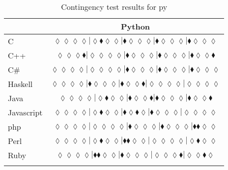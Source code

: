 \begin{table*}
\centering
\begin{tabular}{l c}
& Python \\
\hline

C & $\scriptscriptstyle\lozenge\lozenge\lozenge\lozenge|\lozenge\blacklozenge\lozenge\lozenge|\blacklozenge\lozenge\lozenge\lozenge|\blacklozenge\lozenge\lozenge\lozenge|\blacklozenge\lozenge\lozenge\lozenge$ \\
C++ & $\scriptscriptstyle\lozenge\lozenge\lozenge\blacklozenge|\lozenge\lozenge\lozenge\lozenge|\blacklozenge\lozenge\lozenge\lozenge|\blacklozenge\lozenge\lozenge\lozenge|\blacklozenge\lozenge\lozenge\blacklozenge$ \\
C\# & $\scriptscriptstyle\lozenge\lozenge\lozenge\lozenge|\lozenge\lozenge\lozenge\lozenge|\blacklozenge\lozenge\lozenge\lozenge|\blacklozenge\lozenge\lozenge\lozenge|\blacklozenge\lozenge\lozenge\lozenge$ \\
Haskell & $\scriptscriptstyle\lozenge\lozenge\lozenge\lozenge|\blacklozenge\lozenge\lozenge\lozenge|\blacklozenge\lozenge\lozenge\blacklozenge|\lozenge\lozenge\lozenge\lozenge|\lozenge\lozenge\lozenge\lozenge$ \\
Java & $\scriptscriptstyle\lozenge\lozenge\lozenge\lozenge|\lozenge\blacklozenge\lozenge\lozenge|\blacklozenge\lozenge\lozenge\blacklozenge|\blacklozenge\lozenge\lozenge\lozenge|\blacklozenge\lozenge\lozenge\blacklozenge$ \\
Javascript & $\scriptscriptstyle\lozenge\lozenge\lozenge\lozenge|\lozenge\blacklozenge\lozenge\lozenge|\blacklozenge\lozenge\blacklozenge\lozenge|\blacklozenge\lozenge\lozenge\lozenge|\lozenge\lozenge\lozenge\lozenge$ \\
{\sc php} & $\scriptscriptstyle\lozenge\lozenge\lozenge\lozenge|\lozenge\lozenge\lozenge\lozenge|\blacklozenge\lozenge\lozenge\lozenge|\blacklozenge\lozenge\lozenge\lozenge|\blacklozenge\blacklozenge\lozenge\lozenge$ \\
Perl & $\scriptscriptstyle\lozenge\lozenge\lozenge\lozenge|\lozenge\blacklozenge\lozenge\lozenge|\blacklozenge\blacklozenge\lozenge\lozenge|\lozenge\lozenge\lozenge\lozenge|\lozenge\blacklozenge\lozenge\lozenge$ \\
Ruby & $\scriptscriptstyle\lozenge\lozenge\lozenge\lozenge|\blacklozenge\blacklozenge\lozenge\lozenge|\blacklozenge\lozenge\lozenge\lozenge|\lozenge\lozenge\lozenge\blacklozenge|\lozenge\lozenge\blacklozenge\lozenge$ \\

\hline
& \\
\end{tabular}
\caption{Contingency test results for py}
\label{tbl:contingency-test-results-py}
\end{table*}


